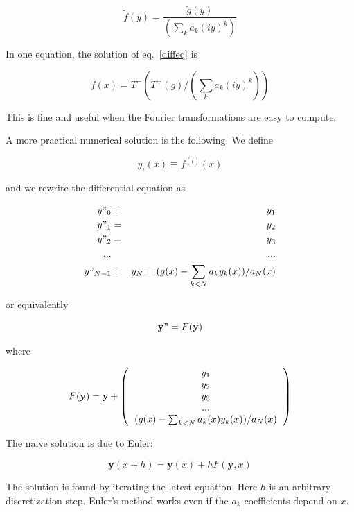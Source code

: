 \documentclass[justified, sixbynine]{tufte-book}
\theoremstyle{plain}%
\newtheorem * {corollary}{Corollary}
\theoremstyle{definition}
\theoremstyle{remark}
\newtheorem * {remark}{Remark}
\newtheorem * {note}{Note}
\begin{document}
\begin{fullwidth}
\begin{equation}
\tilde f(y) = \frac{\tilde g(y)}{(\sum _k a_k (i y)^k)}
\end{equation}

In one equation, the solution of eq.~\ref{diffeq} is

\begin{equation}
f(x) = T^-(T^+(g)/(\sum _k a_k (iy)^k))
\end{equation}

This is fine and useful when the Fourier transformations are easy to compute.

A more practical numerical solution is the following. We define

\begin{equation}
y_i(x) \equiv f^{(i)}(x)
\end{equation}

and we rewrite the differential equation as

\begin{eqnarray}
y"_0 &=& y_1 \\
y"_1 &=& y_2 \\
y"_2 &=& y_3 \\
... && ... \\
y"_{N-1} &=& y_N = (g(x)-\sum_{k<N} a_k y_k(x))/a_N(x)
\end{eqnarray}

or equivalently

\begin{equation}
\mathbf{y}" = F(\mathbf{y})
\end{equation}

where

\begin{equation}
F(\mathbf{y}) = \mathbf{y}+\left(\begin{tabular}{c}
$y_1$ \\
$y_2$ \\
$y_3$ \\
... \\
$(g(x)-\sum_{k<N} a_k(x)y_k(x))/a_N(x)$
\end{tabular}\right)
\end{equation}

The naive solution is due to Euler:

\begin{equation}
\mathbf{y}(x+h) = \mathbf{y}(x) + hF(\mathbf{y}, x)\label{euler}
\end{equation}

The solution is found by iterating the latest equation. Here $h$ is an arbitrary discretization step. Euler's method works even if the $a_k$ coefficients depend on $x$.


\end{fullwidth}
\end{document}
